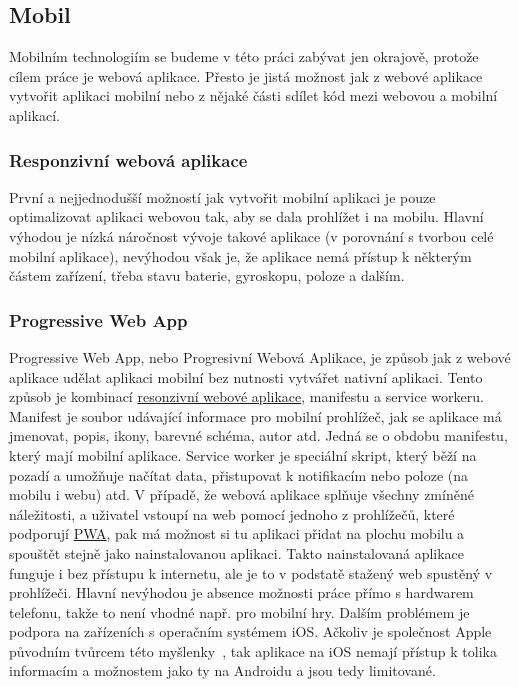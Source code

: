 \subsection{Mobil}
\label{ss:mobile}
Mobilním technologiím se budeme v této práci zabývat jen okrajově, protože cílem práce je webová aplikace. Přesto je jistá možnost jak z webové aplikace vytvořit aplikaci mobilní nebo z nějaké části sdílet kód mezi webovou a mobilní aplikací.

\subsubsection*{Responzivní webová aplikace}
\label{sss:responsive_web_app}
První a nejjednodušší možností jak vytvořit mobilní aplikaci je pouze optimalizovat aplikaci webovou tak, aby se dala prohlížet i na mobilu. Hlavní výhodou je nízká náročnost vývoje takové aplikace (v porovnání s tvorbou celé mobilní aplikace), nevýhodou však je, že aplikace nemá přístup k některým částem zařízení, třeba stavu baterie, gyroskopu, poloze a dalším.

\subsubsection*{Progressive Web App}
\label{sss:pwa}
Progressive Web App, nebo Progresivní Webová Aplikace, je způsob jak z webové aplikace udělat aplikaci mobilní bez nutnosti vytvářet nativní aplikaci. Tento způsob je kombinací \hyperref[sss:responsive_web_app]{resonzivní webové aplikace}, manifestu a service workeru. Manifest je soubor udávající informace pro mobilní prohlížeč, jak se aplikace má jmenovat, popis, ikony, barevné schéma, autor atd. Jedná se o obdobu manifestu, který mají mobilní aplikace. Service worker je speciální skript, který běží na pozadí a umožňuje načítat data, přistupovat k notifikacím nebo poloze (na mobilu i webu) atd. V případě, že webová aplikace splňuje všechny zmíněné náležitosti, a uživatel vstoupí na web pomocí jednoho z prohlížečů, které podporují \hyperref[sss:pwa]{PWA}, pak má možnost si tu aplikaci přidat na plochu mobilu a spouštět stejně jako nainstalovanou aplikaci. Takto nainstalovaná aplikace funguje i bez přístupu k internetu, ale je to v podstatě stažený web spustěný v prohlížeči. Hlavní nevýhodou je absence možnosti práce přímo s hardwarem telefonu, takže to není vhodné např. pro mobilní hry. Dalším problémem je podpora na zařízeních s operačním systémem iOS. Ačkoliv je společnost Apple původním tvůrcem této myšlenky~\cite{ritchie_2018_app}, tak aplikace na iOS nemají přístup k tolika informacím a možnostem jako ty na Androidu a jsou tedy limitované.

